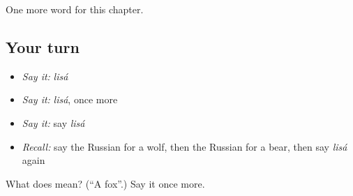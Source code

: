 \begin{grammarlens}[title={What you've built}]
One more word for this chapter.
\end{grammarlens}

\subsection*{Your turn}
\begin{itemize}
\raggedright
  \item \emph{Say it:} \emph{lisá}
  \item \emph{Say it:} \emph{lisá}, once more
  \item \emph{Say it:} say \emph{lisá}
  \item \emph{Recall:} say the Russian for a wolf, then the Russian for a bear, then say \emph{lisá} again
\end{itemize}

\begin{tcolorbox}[breakable,colback=teal!4,colframe=teal!35!black,title={Before you move on}]
What does  mean? (\textquotedblleft{}A fox\textquotedblright{}.) Say it once more.
\end{tcolorbox}
